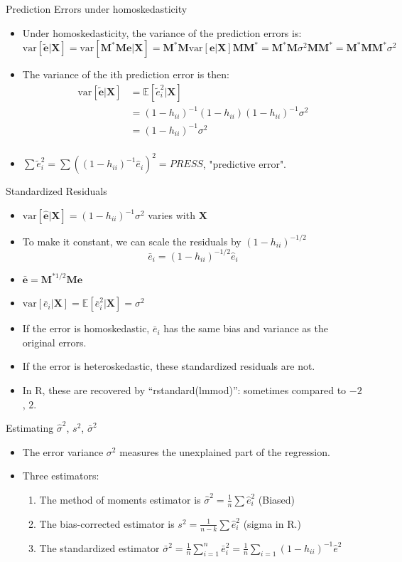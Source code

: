 \documentclass[aspectratio=169, handout]{beamer}
\numberwithin{equation}{section}
\newcommand{\var}{\text{var}}
\begin{document}
\begin{frame}{Prediction Errors under homoskedasticity}
\begin{itemize}
\item Under homoskedasticity, the variance of the prediction errors is:
 $$\var[\bm{\tilde{e}}|\bm{X}]=\var[\bm{M^*Me}|\bm{X}]=\bm{M^*M}\var[\bm{e}|\bm{X}]\bm{MM^*}=\bm{M^*M}\sigma^2\bm{MM^*}=\bm{M^*MM^*}\sigma^2$$
\item The variance of the ith prediction error is then:
 \begin{align*}
\var[\bm{\tilde{e}}|\bm{X}]&=\mathbb{E}[\tilde{e}_i^2|\bm{X}]\\
&=(1-h_{ii})^{-1}(1-h_{ii})(1-h_{ii})^{-1}\sigma^2\\
&=(1-h_{ii})^{-1}\sigma^2\\
\end{align*}
\item $\sum \tilde{e}_i^2=\sum ((1-h_{ii})^{-1}\hat{e}_i)^2=PRESS$, "predictive error".
\end{itemize}
\end{frame}

\begin{frame}{Standardized Residuals}
\begin{itemize}
\item $\var[\bm{\hat{e}}|\bm{X}]=(1-h_{ii})^{-1}\sigma^2$ varies with $\bm{X}$
\item To make it constant, we can scale the residuals by $(1-h_{ii})^{-1/2}$
$$\bar{e}_i=(1-h_{ii})^{-1/2}\hat{e}_i$$
\item $\bm{\bar{e}}=\bm{M}^{*1/2}\bm{Me}$
\item $\var[\bar{e}_i|\bm{X}]=\mathbb{E}[\bar{e}_i^2|\bm{X}]=\sigma^2$
\item If the error is homoskedastic, $\bar{e}_i$ has the same bias and variance as the original errors.
\item If the error is heteroskedastic, these standardized residuals are not.
\item In R, these are recovered by ``rstandard(lmmod)'': sometimes compared to $-2$, $2$.
\end{itemize}
\end{frame}  



\begin{frame}{Estimating $\hat{\sigma}^2$, $s^2$, $\bar{\sigma}^2$}
\begin{itemize}
\item The error variance $\sigma^2$ measures the unexplained part of the regression.
\item Three estimators:
\begin{enumerate}
\item The method of moments estimator is $\hat{\sigma}^2=\frac{1}{n}\sum\hat{e}_i^2$ (Biased)
\item The bias-corrected estimator is $s^2=\frac{1}{n-k}\sum\hat{e}_i^2$ (sigma in R.)
\item The standardized estimator $\bar{\sigma}^2=\frac{1}{n}\sum_{i=1}^n\bar{e}_i^2=\frac{1}{n}\sum_{i=1}(1-h_{ii})^{-1}\hat{e}^2$
\end{enumerate}
\end{itemize}
\end{frame}  
\end{document}
